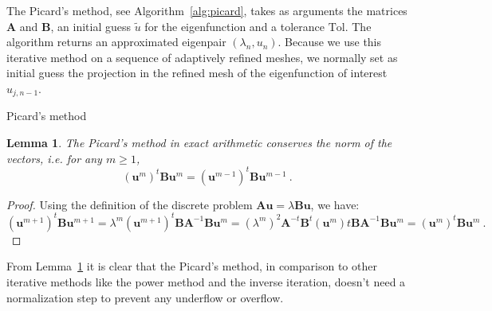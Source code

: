 \documentclass[preprint ,12pt]{elsarticle}
\newtheorem{lemma}[theorem]{Lemma}
\begin{document}
The Picard's method, see Algorithm~\ref{alg:picard}, takes as arguments the matrices $\mathbf{A}$ and $\mathbf{B}$, an initial guess $\tilde u$ for the eigenfunction and a tolerance $\mathrm{Tol}$. The algorithm returns an approximated eigenpair $(\lambda_{n},u_{n})$.
Because we use this iterative method on a sequence of adaptively refined meshes, we normally set as initial guess
the projection in the refined mesh of the eigenfunction of interest $u_{j,n-1}$.

\begin{algorithm}[H] \caption{Picard's method} \label{alg:picard} 
\begin{algorithmic}


\REPEAT

\end{algorithmic}
\end{algorithm}

\begin{lemma}\label{lm:picard_b}
The Picard's method in exact arithmetic conserves the norm of the vectors, i.e. for any $m\ge 1$,
$$
(\mathbf{u}^{m})^t\mathbf{B}\mathbf{u}^{m}=(\mathbf{u}^{m-1})^t\mathbf{B}\mathbf{u}^{m-1}\ .
$$
\end{lemma}

\begin{proof}
Using the definition of the discrete problem $\mathbf{A}\mathbf{u}=\lambda \mathbf{B}\mathbf{u}$, we have:
$$
(\mathbf{u}^{m+1})^t\mathbf{B}\mathbf{u}^{m+1}=\lambda^m(\mathbf{u}^{m+1})^t\mathbf{B}\mathbf{A}^{-1}\mathbf{B}\mathbf{u}^{m}
=(\lambda^m)^2\mathbf{A}^{-t}\mathbf{B}^t(\mathbf{u}^{m})t\mathbf{B}\mathbf{A}^{-1}\mathbf{B}\mathbf{u}^{m}
=(\mathbf{u}^{m})^t\mathbf{B}\mathbf{u}^{m}\ .
$$
\end{proof}

From Lemma~\ref{lm:picard_b} it is clear that the Picard's method, in comparison to other iterative methods like the power method and the inverse iteration, doesn't need a normalization step to prevent any underflow or overflow.
\end{document}
